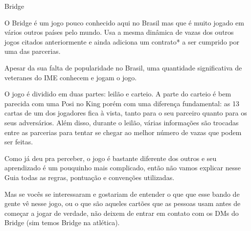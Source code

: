\begin{subsecao}{Bridge}

O Bridge é um jogo pouco conhecido aqui no Brasil mas que é muito jogado em
vários outros países pelo mundo. Usa a mesma dinâmica de vazas dos outros jogos
citados anteriormente e ainda adiciona um contrato* a ser cumprido por uma das
parcerias.

Apesar da sua falta de popularidade no Brasil, uma quantidade significativa de 
veteranes do IME conhecem e jogam o jogo.

O jogo é dividido em duas partes: leilão e carteio. A parte do carteio é bem
parecida com uma Posi no King porém com uma diferença fundamental: as 13 cartas
de um dos jogadores fica à vista, tanto para o seu parceiro quanto para os seus
adversários. Além disso, durante o leilão, várias informações são trocadas entre
as parcerias para tentar se chegar ao melhor número de vazas que podem ser
feitas.

Como já deu pra perceber, o jogo é bastante diferente dos outros e seu
aprendizado é um pouquinho mais complicado, então não vamos explicar nesse Guia
todas as regras, pontuação e convenções utilizadas.

Mas se vocês se interessaram e gostariam de entender o que que esse bando de
gente vê nesse jogo, ou o que são aqueles cartões que as pessoas usam antes de
começar a jogar de verdade, não deixem de entrar em contato com os DMs do Bridge (sim temos Bridge na atlética).

\end{subsecao}
